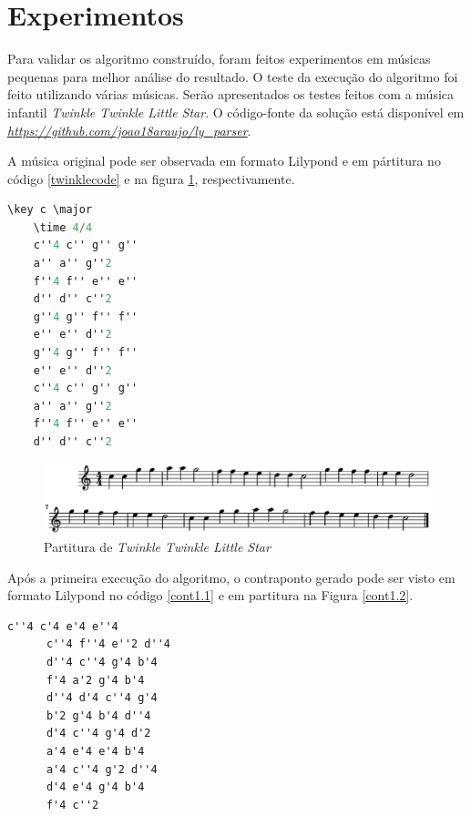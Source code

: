   \section[Experimentos]{Experimentos}

    Para validar os algoritmo construído, foram feitos experimentos em músicas pequenas para melhor análise do resultado. O teste da execução do algoritmo foi feito utilizando várias músicas. Serão apresentados os testes feitos com a música infantil \textit{Twinkle Twinkle Little Star}. O código-fonte da solução está disponível em \textit{\url{https://github.com/joao18araujo/ly_parser}}.

    A música original pode ser observada em formato Lilypond e em pártitura no código \ref{twinklecode} e na figura \ref{twinkleoriginal}, respectivamente.

    \begin{lstlisting}[language={C}, caption={\textit{Twinkle Twinkle Little Star}}, label={twinklecode}]
    \key c \major
    \time 4/4
    c''4 c'' g'' g''
    a'' a'' g''2
    f''4 f'' e'' e''
    d'' d'' c''2
    g''4 g'' f'' f''
    e'' e'' d''2
    g''4 g'' f'' f''
    e'' e'' d''2
    c''4 c'' g'' g''
    a'' a'' g''2
    f''4 f'' e'' e''
    d'' d'' c''2
    \end{lstlisting}

    \begin{figure}[htb]
      \centering
      \includegraphics[scale=0.6]{figuras/twinkleoriginal.eps}
      \caption{Partitura de \textit{Twinkle Twinkle Little Star}}
      \label{twinkleoriginal}
    \end{figure}

    Após a primeira execução do algoritmo, o contraponto gerado pode ser visto em formato Lilypond no código \ref{cont1.1} e em partitura na Figura \ref{cont1.2}.

    \begin{lstlisting}[caption={Primeiro contraponto gerado}, label={cont1.1}]
      c''4 c'4 e'4 e''4
      c''4 f''4 e''2 d''4
      d''4 c''4 g'4 b'4
      f'4 a'2 g'4 b'4
      d''4 d'4 c''4 g'4
      b'2 g'4 b'4 d''4
      d'4 c''4 g'4 d'2
      a'4 e'4 e'4 b'4
      a'4 c''4 g'2 d''4
      d'4 e'4 g'4 b'4
      f'4 c''2
    \end{lstlisting}


